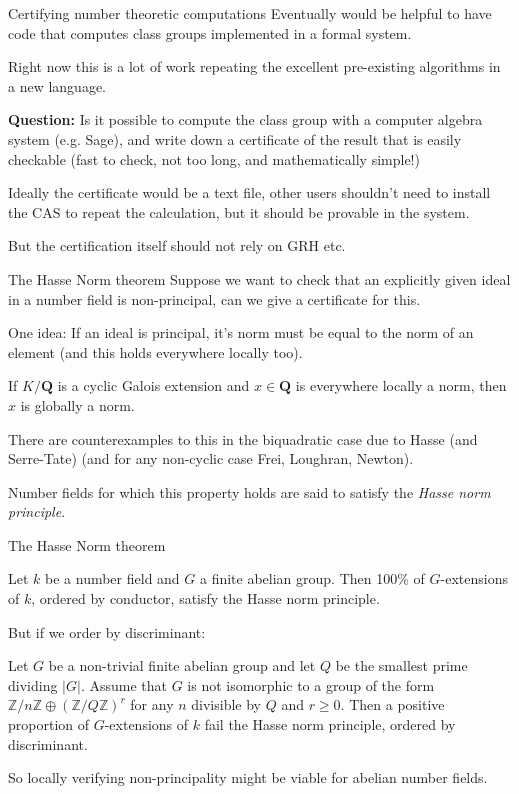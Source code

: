 \documentclass{beamer}
\theoremstyle{plain}
\begin{document}
\begin{frame}{Certifying number theoretic computations}
    Eventually would be helpful to have code that computes class groups implemented in a formal system.

    Right now this is a lot of work repeating the excellent pre-existing algorithms in a new language.  \pause

    \textbf{Question:} Is it possible to compute the class group with a computer algebra system (e.g. Sage), and write down a certificate of the result that is easily checkable (fast to check, not too long, and mathematically simple!)

    Ideally the certificate would be a text file, other users shouldn't need to install the CAS to repeat the calculation, but it should be provable in the system.

    But the certification itself should not rely on GRH etc.
\end{frame}

\begin{frame}{The Hasse Norm theorem}
    Suppose we want to check that an explicitly given ideal in a number field is non-principal, can we give a certificate for this.

    One idea: If an ideal is principal, it's norm must be equal to the norm of an element (and this holds everywhere locally too).

    \begin{theorem}
        If $K/\mathbf Q$ is a cyclic Galois extension and $x \in \mathbf Q$ is everywhere locally a norm, then $x$ is globally a norm.
    \end{theorem}
\pause
    There are counterexamples to this in the biquadratic case due to Hasse (and Serre-Tate) (and for any non-cyclic case Frei, Loughran, Newton).

    Number fields for which this property holds are said to satisfy the \emph{Hasse norm principle}.
\end{frame}

\begin{frame}{The Hasse Norm theorem}
    \begin{theorem}
        Let $k$ be a number field and $G$ a finite abelian group. Then 100\% of $G$-extensions of $k$, ordered by conductor, satisfy the Hasse norm principle.
    \end{theorem}\pause
    But if we order by discriminant:

    \begin{theorem} Let $G$ be a non-trivial finite abelian group and let $Q$ be the smallest prime dividing $|G|$. Assume that $G$ is not isomorphic to a group of the form $\mathbb{Z} / n \mathbb{Z} \oplus(\mathbb{Z} / Q \mathbb{Z})^{r}$ for any $n$ divisible by $Q$ and $r \geq 0$. Then a positive proportion of $G$-extensions of $k$ fail the Hasse norm principle, ordered by discriminant.
    \end{theorem}
    So locally verifying non-principality might be viable for abelian number fields.
\end{frame}
\end{document}
